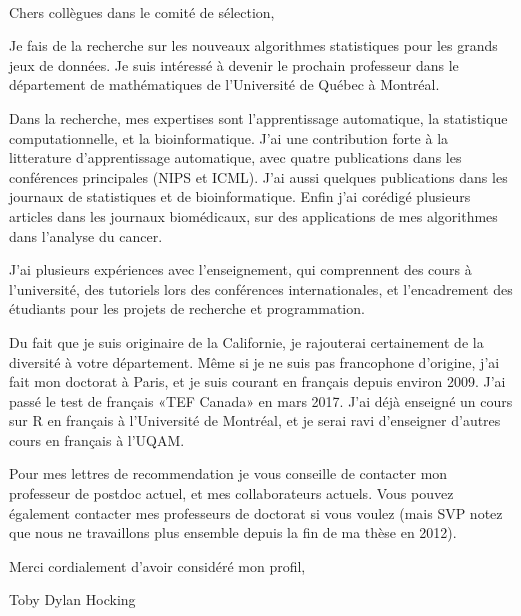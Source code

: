 \documentclass{article}
\begin{document}
\mbox{ }

Chers collègues dans le comité de sélection,

Je fais de la recherche sur les nouveaux algorithmes statistiques pour
les grands jeux de données. Je suis intéressé à devenir le prochain
professeur dans le département de mathématiques de l'Université de
Québec à Montréal.

Dans la recherche, mes expertises sont l'apprentissage automatique, la
statistique computationnelle, et la bioinformatique. J'ai une
contribution forte à la litterature d'apprentissage automatique, avec
quatre publications dans les conférences principales (NIPS et
ICML). J'ai aussi quelques publications dans les journaux de
statistiques et de bioinformatique. Enfin j'ai corédigé plusieurs
articles dans les journaux biomédicaux, sur des applications de mes
algorithmes dans l'analyse du cancer.
 
J'ai plusieurs expériences avec l'enseignement, qui comprennent des cours
à l'université, des tutoriels lors des conférences internationales, et
l'encadrement des étudiants pour les projets de recherche et
programmation.

Du fait que je suis originaire de la Californie, je rajouterai
certainement de la diversité à votre département. Même si je ne
suis pas francophone d'origine, j'ai fait mon doctorat à Paris, et je
suis courant en français depuis environ 2009. J'ai passé le test de
français «TEF Canada» en mars 2017. J'ai déjà enseigné un cours sur R
en français à l'Université de Montréal, et je serai ravi d'enseigner d'autres cours
en français à l'UQAM.

Pour mes lettres de recommendation je vous conseille de contacter mon
professeur de postdoc actuel, et mes collaborateurs actuels. Vous
pouvez également contacter mes professeurs de doctorat si vous voulez
(mais SVP notez que nous ne travaillons plus ensemble depuis la fin de
ma thèse en 2012).

Merci cordialement d'avoir considéré mon profil, 

Toby Dylan Hocking
\end{document}
